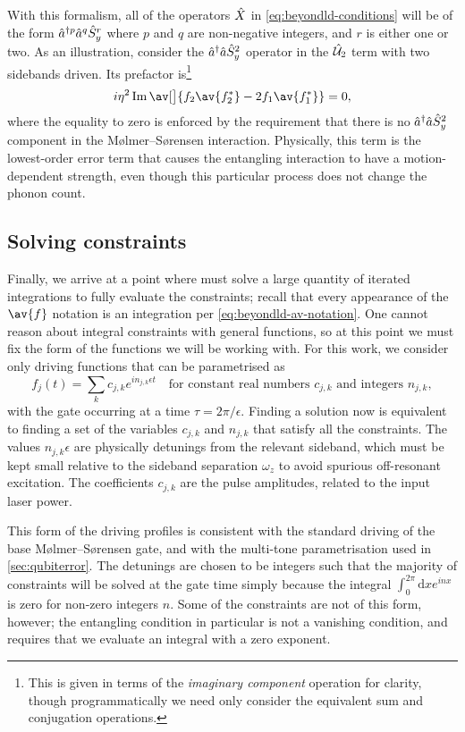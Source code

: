 With this formalism, all of the operators $\hat{X}$ in \cref{eq:beyondld-conditions} will be of the form $\hat{a}^{\dagger p}\hat{a}^q\hat{S}_y^r$ where $p$ and $q$ are non-negative integers, and $r$ is either one or two.
As an illustration, consider the $\hat{a}^\dagger\hat{a}\hat{S}_y^2$ operator in the $\hat{\mathcal U}_2$ term with two sidebands driven.
Its prefactor is\footnote{This is given in terms of the \emph{imaginary component} operation for clarity, though programmatically we need only consider the equivalent sum and conjugation operations.}
\begin{equation}
i\eta^2\Im\av[\big]{f_2\av{f_2^*} - 2f_1\av{f_1^*}} = 0,
\end{equation}
where the equality to zero is enforced by the requirement that there is no $\hat{a}^\dagger\hat{a}\hat{S}_y^2$ component in the M\o lmer--S\o rensen interaction.
Physically, this term is the lowest-order error term that causes the entangling interaction to have a motion-dependent strength, even though this particular process does not change the phonon count.


\subsection{Solving constraints}

Finally, we arrive at a point where must solve a large quantity of iterated integrations to fully evaluate the constraints; recall that every appearance of the $\av{f}$ notation is an integration per \cref{eq:beyondld-av-notation}.
One cannot reason about integral constraints with general functions, so at this point we must fix the form of the functions we will be working with.
For this work, we consider only driving functions that can be parametrised as
\begin{equation}\label{eq:beyondld-driving-form}
f_j(t) = \sum_k c_{j,k} e^{i n_{j,k} \epsilon t}\quad\text{for constant real numbers $c_{j,k}$ and integers $n_{j,k}$},
\end{equation}
with the gate occurring at a time $\tau = 2\pi/\epsilon$.
Finding a solution now is equivalent to finding a set of the variables $c_{j,k}$ and $n_{j,k}$ that satisfy all the constraints.
The values $n_{j,k}\epsilon$ are physically detunings from the relevant sideband, which must be kept small relative to the sideband separation $\omega_z$ to avoid spurious off-resonant excitation.
The coefficients $c_{j,k}$ are the pulse amplitudes, related to the input laser power.

This form of the driving profiles is consistent with the standard driving of the base M\o lmer--S\o rensen gate, and with the multi-tone parametrisation used in \cref{sec:qubiterror}.
The detunings are chosen to be integers such that the majority of constraints will be solved at the gate time simply because the integral $\int_0^{2\pi}\mathrm dx e^{inx}$ is zero for non-zero integers $n$.
Some of the constraints are not of this form, however; the entangling condition in particular is not a vanishing condition, and requires that we evaluate an integral with a zero exponent.

